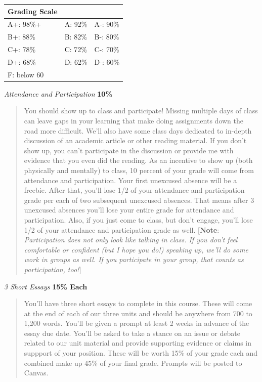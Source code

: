 \documentclass[11pt,]{article}
\begin{document}
\begin{longtable}[]{@{}lll@{}}
\toprule()
\textbf{Grading Scale} & & \\
\midrule()
\endhead
A+: 98\%+ & A: 92\% & A-: 90\% \\
B+: 88\% & B: 82\% & B-: 80\% \\
C+: 78\% & C: 72\% & C-: 70\% \\
D+: 68\% & D: 62\% & D-: 60\% \\
F: below 60 & & \\
\bottomrule()
\end{longtable}

\emph{Attendance and Participation} \textbf{10\%}

\begin{quote}
You should show up to class and participate! Missing multiple days of
class can leave gaps in your learning that make doing assignments down
the road more difficult. We'll also have some class days dedicated to
in-depth discussion of an academic article or other reading material. If
you don't show up, you can't participate in the discussion or provide me
with evidence that you even did the reading. As an incentive to show up
(both physically and mentally) to class, 10 percent of your grade will
come from attendance and participation. Your first unexcused absence
will be a freebie. After that, you'll lose 1/2 of your attendance and
participation grade per each of two subsequent unexcused absences. That
means after 3 unexcused absences you'll lose your entire grade for
attendance and participation. Also, if you just come to class, but don't
engage, you'll lose 1/2 of your attendance and participation grade as
well. {[}\textbf{Note}: \emph{Participation does not only look like
talking in class. If you don't feel comfortable or confident (but I hope
you do!) speaking up, we'll do some work in groups as well. If you
participate in your group, that counts as participation, too!}{]}
\end{quote}

\emph{3 Short Essays} \textbf{15\% Each}

\begin{quote}
You'll have three short essays to complete in this course. These will
come at the end of each of our three units and should be anywhere from
700 to 1,200 words. You'll be given a prompt at least 2 weeks in advance
of the essay due date. You'll be asked to take a stance on an issue or
debate related to our unit material and provide supporting evidence or
claims in suppport of your position. These will be worth 15\% of your
grade each and combined make up 45\% of your final grade. Prompts will
be posted to Canvas.
\end{quote}
\end{document}
